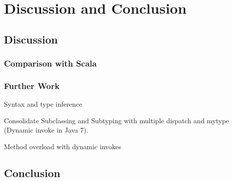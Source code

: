 
\part{Discussion and Conclusion}
\chapter{Discussion}
\section{Comparison with Scala}

\section{Further Work}
Syntax and type inference


Consolidate Subclassing and Subtyping with multiple dispatch and mytype (Dynamic invoke in Java 7).

Method overload with dynamic invokes


\chapter{Conclusion}
